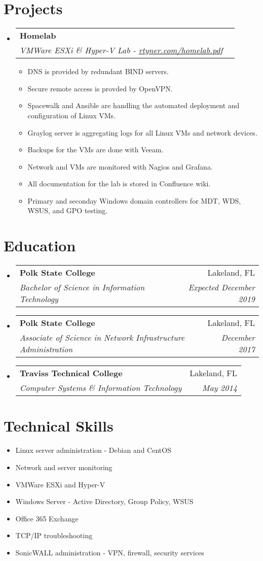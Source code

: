 \documentclass[letterpaper,11pt]{article}
\makeatletter
\newcommand{\resumeItem}[2]{
  \item\small{
    \textbf{}{#2 \vspace{-2pt}}
  }
}
\newcommand{\resumeSubheading}[4]{
  \vspace{-1pt}\item
    \begin{tabular*}{0.97\textwidth}{l@{\extracolsep{\fill}}r}
      \textbf{#1} & #2 \\
      \textit{\small#3} & \textit{\small #4} \\
    \end{tabular*}\vspace{-5pt}
}
\newcommand{\resumeSubItem}[2]{\resumeItem{#1}{#2}\vspace{-4pt}}
\newcommand{\resumeSubHeadingListStart}{\begin{itemize}[leftmargin=*]}
\newcommand{\resumeSubHeadingListEnd}{\end{itemize}}
\newcommand{\resumeItemListStart}{\begin{itemize}}
\newcommand{\resumeItemListEnd}{\end{itemize}\vspace{-5pt}}
\makeatother
\begin{document}
\section{Projects}
  \resumeSubHeadingListStart
    \resumeSubheading
      {Homelab}{}
      {VMWare ESXi \& Hyper-V Lab - \href{https://rtyner.com/homelab.pdf}{rtyner.com/homelab.pdf}}{}
      \resumeItemListStart
        \resumeItem{}
          {DNS is provided by redundant BIND servers.}
        \resumeItem{}
          {Secure remote access is provded by OpenVPN.}
        \resumeItem{}
          {Spacewalk and Ansible are handling the automated deployment and configuration of Linux VMs.}
        \resumeItem{}
          {Graylog server is aggregating logs for all Linux VMs and network devices.}
        \resumeItem{}
          {Backups for the VMs are done with Veeam.}
        \resumeItem{}
          {Network and VMs are monitored with Nagios and Grafana.}
        \resumeItem{}
          {All documentation for the lab is stored in Confluence wiki.}
        \resumeItem{}
          {Primary and seconday Windows domain controllers for MDT, WDS, WSUS, and GPO testing.}
      \resumeItemListEnd
  \resumeSubHeadingListEnd

\section{Education}
  \resumeSubHeadingListStart
    \resumeSubheading
      {Polk State College}{Lakeland, FL}
      {Bachelor of Science in Information Technology}{Expected December 2019}
    \resumeSubheading
      {Polk State College}{Lakeland, FL}
      {Associate of Science in Network Infrastructure Administration}{December 2017}
    \resumeSubheading
      {Traviss Technical College}{Lakeland, FL}
      {Computer Systems \& Information Technology}{May 2014}
  \resumeSubHeadingListEnd

\section{Technical Skills}
  \resumeSubHeadingListStart
    \resumeSubItem{}
      {Linux server administration - Debian and CentOS}
    \resumeSubItem{}
      {Network and server monitoring}
    \resumeSubItem{}
      {VMWare ESXi and Hyper-V}    
    \resumeSubItem{}
      {Windows Server - Active Directory, Group Policy, WSUS}
    \resumeSubItem{}
      {Office 365 Exchange}
    \resumeSubItem{}
      {TCP/IP troubleshooting}
    \resumeSubItem{}
      {SonicWALL administration - VPN, firewall, security services}
  \resumeSubHeadingListEnd
\end{document}

